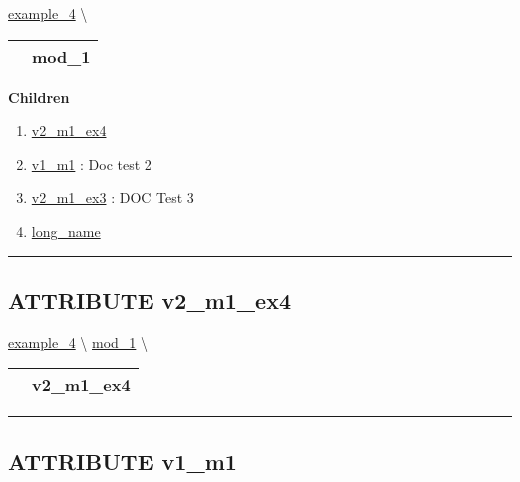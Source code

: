 \hypertarget{ecldoc:intest.in1intest.example_4.mod_1}{}
\hspace{0pt} \hyperlink{ecldoc:intest.in1intest.example_4}{example_4} \textbackslash 

{\renewcommand{\arraystretch}{1.5}
\begin{tabularx}{\textwidth}{|>{\raggedright\arraybackslash}l|X|}
\hline
\hspace{0pt}\mytexttt{\color{red} } & \textbf{mod\_1} \\
\hline
\end{tabularx}
}

\par


\textbf{Children}
\begin{enumerate}
\item \hyperlink{ecldoc:intest.in1intest.example_4.mod_1.v2_m1_ex4}{v2\_m1\_ex4}
\item \hyperlink{ecldoc:example_3.mod_1.v1_m1}{v1\_m1}
: Doc test 2
\item \hyperlink{ecldoc:example_3.mod_1.v2_m1_ex3}{v2\_m1\_ex3}
: DOC Test 3
\item \hyperlink{ecldoc:example_3.mod_1.long_name}{long\_name}
\end{enumerate}

\rule{\linewidth}{0.5pt}

\subsection*{\textsf{\colorbox{headtoc}{\color{white} ATTRIBUTE}
v2\_m1\_ex4}}

\hypertarget{ecldoc:intest.in1intest.example_4.mod_1.v2_m1_ex4}{}
\hspace{0pt} \hyperlink{ecldoc:intest.in1intest.example_4}{example_4} \textbackslash 
\hspace{0pt} \hyperlink{ecldoc:intest.in1intest.example_4.mod_1}{mod_1} \textbackslash 

{\renewcommand{\arraystretch}{1.5}
\begin{tabularx}{\textwidth}{|>{\raggedright\arraybackslash}l|X|}
\hline
\hspace{0pt}\mytexttt{\color{red} } & \textbf{v2\_m1\_ex4} \\
\hline
\end{tabularx}
}

\par


\rule{\linewidth}{0.5pt}
\subsection*{\textsf{\colorbox{headtoc}{\color{white} ATTRIBUTE}
v1\_m1}}

